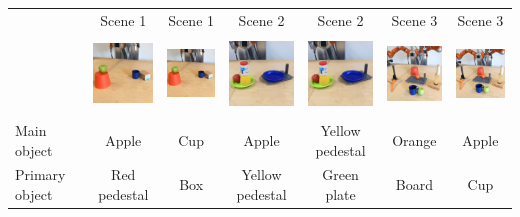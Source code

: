 {\small
\begin{landscape}
  \begin{longtable}{clcccccc}
    \toprule
        &               & Scene 1       & Scene 1       & Scene 2       & Scene 2       & Scene 3       & Scene 3\\
        & & \includegraphics[height=2cm]{./figures/sec/scene_photos/affordance_scene4.jpg}
          & \includegraphics[height=2cm]{./figures/sec/scene_photos/affordance_scene4.jpg}
          & \includegraphics[height=2cm]{./figures/sec/scene_photos/affordance_scene7.jpg}
          & \includegraphics[height=2cm]{./figures/sec/scene_photos/affordance_scene7.jpg}
          & \includegraphics[height=2cm]{./figures/sec/scene_photos/affordance_scene5.jpg}
          & \includegraphics[height=2cm]{./figures/sec/scene_photos/affordance_scene5.jpg}\\
    \multicolumn{2}{l}{Main object}       & Apple           & Cup             & Apple             & Yellow pedestal   & Orange    & Apple\\
    \multicolumn{2}{l}{Primary object}    & Red pedestal    & Box             & Yellow pedestal   & Green plate       & Board     & Cup\\

\end{longtable}
\end{landscape}}
